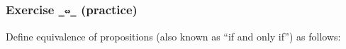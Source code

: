 \begin{fence}
\begin{code}%
\>[0]\<%
\\
\>[0][@{}l@{\AgdaIndent{0}}]%
\>[2]\AgdaSpace{}%
\AgdaSymbol{:}\AgdaSpace{}%
\AgdaSpace{}%
\AgdaSymbol{\{}\AgdaSpace{}%
\AgdaSpace{}%
\AgdaSymbol{:}\AgdaSpace{}%
\AgdaSymbol{\}}\<%
\\
\>[2][@{}l@{\AgdaIndent{0}}]%
\>[4]%
\>[886I]\AgdaSpace{}%
\AgdaSpace{}%
\<%
\\
\>[.][@{}l@{}]\<[886I]%
\>[6]\AgdaComment{-----}\<%
\\
%
\>[4]\AgdaSpace{}%
\AgdaSpace{}%
\AgdaSpace{}%
\<%
\end{code}
\end{fence}

\begin{fence}
\begin{code}%
\>[0]\<%
\end{code}
\end{fence}

\hypertarget{Isomorphism-iff}{%
\subsubsection{\texorpdfstring{Exercise \texttt{\_⇔\_}
(practice)}{Exercise \_⇔\_ (practice)}}\label{Isomorphism-iff}}

Define equivalence of propositions (also known as ``if and only if'') as
follows:

\begin{fence}
\begin{code}%
\>[0]\AgdaSpace{}%
\AgdaSpace{}%
\AgdaSymbol{(}\AgdaSpace{}%
\AgdaSpace{}%
\AgdaSymbol{:}\AgdaSpace{}%
\AgdaSymbol{)}\AgdaSpace{}%
\AgdaSymbol{:}\AgdaSpace{}%
\AgdaSpace{}%
\<%
\\
\>[0][@{}l@{\AgdaIndent{0}}]%
\>[2]\<%
\\
\>[2][@{}l@{\AgdaIndent{0}}]%
\>[4]%
\>[9]\AgdaSymbol{:}\AgdaSpace{}%
\AgdaSpace{}%
\AgdaSpace{}%
\<%
\\
%
\>[4]\AgdaSpace{}%
\AgdaSymbol{:}\AgdaSpace{}%
\AgdaSpace{}%
\AgdaSpace{}%
\<%
\end{code}
\end{fence}

